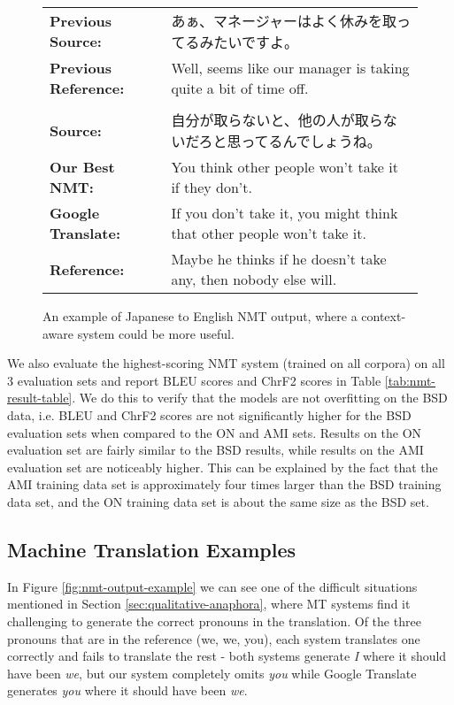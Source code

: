 \documentclass[11pt,a4paper]{article}
\begin{document}
\begin{CJK}{UTF8}{min}
\begin{small}
\begin{figure*}[t]
  \begin{tabular}{lp{12cm}}
   \bf Previous Source: & あぁ、マネージャーはよく休みを取ってるみたいですよ。 \\
   \bf Previous Reference: & Well, seems like our manager is taking quite a bit of time off. \\\\
   \bf Source: & 自分が取らないと、他の人が取らないだろと思ってるんでしょうね。 \\
   \bf Our Best NMT: & You think other people won't take it if they don't. \\
   \bf Google Translate: & If you don't take it, you might think that other people won't take it. \\
   \bf Reference: & Maybe he thinks if he doesn't take any, then nobody else will. \\
  \end{tabular}
  \caption{An example of Japanese to English NMT output, where a context-aware system could be more useful.}
  \label{fig:nmt-output-example-2}
\end{figure*}
\end{small}
\end{CJK}



We also evaluate the highest-scoring NMT system (trained on all corpora) on all 3 evaluation sets and report BLEU scores and ChrF2 scores \cite{popovic2015chrf} in Table \ref{tab:nmt-result-table}. We do this to verify that the models are not overfitting on the BSD data, i.e. BLEU and ChrF2 scores are not significantly higher for the BSD evaluation sets when compared to the ON and AMI sets. Results on the ON evaluation set are fairly similar to the BSD results, while results on the AMI evaluation set are noticeably higher. This can be explained by the fact that the AMI training data set is approximately four times larger than the BSD training data set, and the ON training data set is about the same size as the BSD set.

\subsection{Machine Translation Examples}

In Figure \ref{fig:nmt-output-example} we can see one of the difficult situations mentioned in Section \ref{sec:qualitative-anaphora}, where MT systems find it challenging to generate the correct pronouns in the translation. Of the three pronouns that are in the reference (we, we, you), each system translates one correctly and fails to translate the rest - both systems generate \textit{I} where it should have been \textit{we}, but our system completely omits \textit{you} while Google Translate generates \textit{you} where it should have been \textit{we}.
\end{document}
